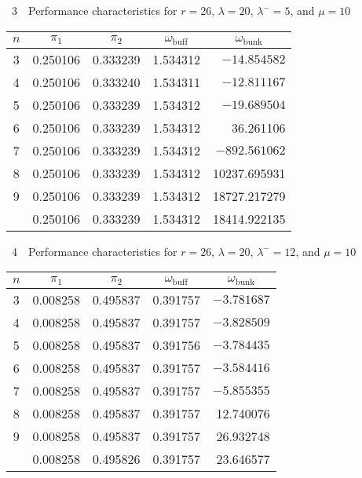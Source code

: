 \begin{multicols}{2}
\noindent
{{\tablename~3}\ \ \small{Performance characteristics for $r=26$, $\lambda=20$, $\lambda^-=5$, 
and $\mu=10$}}
 
 \vspace*{-3pt}

{\small\begin{center}
\tabcolsep=7.1pt
\begin{tabular}{ccccr}
\hline
$n$ & $\pi_{1}$ & $\pi_{2}$ & $\omega_{\mathrm{buff}}$ & 
\multicolumn{1}{c}{$\omega_{\mathrm{bunk}}$}\\
\hline
3&  0.250106 &  0.333239 &  1.534312    & $-14.854582$ \\
4&  0.250106 &  0.333240 &      1.534311 & $ -12.811167$ \\
5&      0.250106 &  0.333239 &  1.534312    & $-19.689504 $\\
6&      0.250106 &  0.333239 &  1.534312    & 36.261106 \\
7&      0.250106 &  0.333239 &  1.534312    &$ -892.561062$ \\
8&      0.250106 &  0.333239 &  1.534312    & 10237.695931 \\
9&      0.250106 &  0.333239 &  1.534312    & 18727.217279 \\
\hline
& 0.250106 &    0.333239    &   1.534312    &18414.922135\\
\hline
\end{tabular}
\end{center}}


\noindent
{{\tablename~4}\ \ \small{Performance characteristics for $r=26$, $\lambda=20$, $\lambda^-=12$, 
and $\mu=10$}}
 
 \vspace*{-3pt}

{\small\begin{center}
\tabcolsep=7.9pt
\begin{tabular}{ccccr}
\hline
$n$ & $\pi_{1}$ & $\pi_{2}$ & $\omega_{\mathrm{buff}}$ & 
\multicolumn{1}{c}{$\omega_{\mathrm{bunk}}$}\\
\hline
3&  0.008258  & 0.495837  & 0.391757    & $-3.781687$ \\
4&  0.008258  & 0.495837 &      0.391757 &  $-3.828509$ \\
5&      0.008258 &  0.495837  & 0.391756    &$ -3.784435 $\\
6&      0.008258 &  0.495837 &  0.391757    & $-3.584416$ \\
7&      0.008258 &  0.495837 &  0.391757    & $-5.855355$ \\
8&      0.008258 &  0.495837  & 0.391757    & 12.740076 \\
9&      0.008258  & 0.495837  & 0.391757    &  26.932748  \\
\hline
& 0.008258 &    0.495826    &   0.391757    & 23.646577 \\
\hline
\end{tabular}
\end{center}}


\end{multicols}
